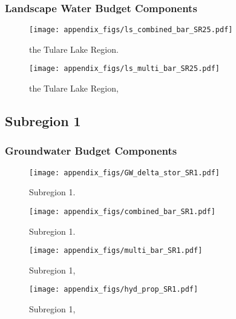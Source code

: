 \subsubsection{Landscape Water Budget Components}
\begin{figure}[ht]
\centerline{\texttt{[image: appendix\_figs/ls\_combined\_bar\_SR25.pdf]}}
\caption{\LSCombinedTextOne the Tulare Lake Region.\LSCombinedTextTwo}
\label{fig:LS_budget_SR25}
\end{figure}
\newpage

\begin{landscape}
\begin{figure}[ht]
\centerline{\texttt{[image: appendix\_figs/ls\_multi\_bar\_SR25.pdf]}}
\caption{\LSMultiTextOne the Tulare Lake Region,\LSMultiTextTwo}
\label{fig:multi_LS_budget_SR25}
\end{figure}
\newpage
\end{landscape}


\subsection{Subregion 1}
\subsubsection{Groundwater Budget Components}
\begin{figure}[h]
\centerline{\texttt{[image: appendix\_figs/GW\_delta\_stor\_SR1.pdf]}}
\caption{\GWBudgetText Subregion 1.}
\label{fig:delta_stor_SR1}
\end{figure}
\newpage

\begin{figure}[ht]
\centerline{\texttt{[image: appendix\_figs/combined\_bar\_SR1.pdf]}}
\caption{\GWCombinedTextOne Subregion 1.\GWCombinedTextTwo}
\label{fig:GW_budget_SR1}
\end{figure}
\newpage

\begin{landscape}
\begin{figure}[ht]
\centerline{\texttt{[image: appendix\_figs/multi\_bar\_SR1.pdf]}}
\caption{\GWMultiTextOne Subregion 1,\GWMultiTextTwo}
\label{fig:multi_GW_budget_SR1}
\end{figure}
\newpage

\begin{figure}[ht]
\centerline{\texttt{[image: appendix\_figs/hyd\_prop\_SR1.pdf]}}
\caption{\HydPropOne Subregion 1,\HydPropTwo}
\label{fig:hyd_prop_SR1}
\end{figure}
\newpage
\end{landscape}

